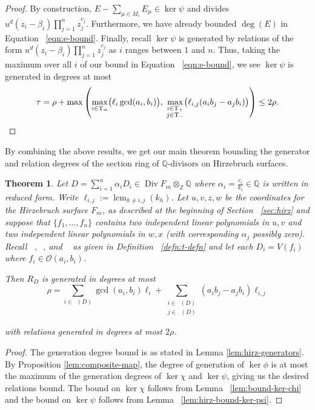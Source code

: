 \documentclass{amsart}
\theoremstyle{plain}
\newtheorem{thm}{Theorem}[subsection]
\theoremstyle{definition}
\theoremstyle{remark}
\newtheorem{rem}[thm]{Remark}
\numberwithin{equation}{section}
\newcommand\bq{{\mathbb Q}}
\newcommand\bz{{\mathbb Z}}
\newcommand\sco{{\mathscr O}}
\DeclareMathOperator\di{Div}
\newcommand\bida{a}
\newcommand\bidb{b}
\newcommand\hirz{F}
\DeclareMathOperator{\Te}{T_=}
\DeclareMathOperator{\Tp}{T_+}
\DeclareMathOperator{\Tm}{T_-}
\DeclareMathOperator{\lcm}{lcm}
\begin{document}
\begin{proof}
By construction, $E - \sum_{\mu \in M_i} E_\mu \in \ker \psi$ and
divides $u^d(z_i - \beta_i) \prod_{j = 1}^n z_j^{c_j}$. 
Furthermore, we have already bounded $\deg(E)$ in Equation ~\eqref{eqn:e-bound}.
Finally, recall $\ker \psi$ is generated by relations of the form $u^d(z_i - \beta_i) \prod_{j = 1}^n z_j^{c_j}$ as
$i$ ranges between $1$ and $n$. Thus, taking the maximum over all $i$ 
of our bound in Equation ~\eqref{eqn:e-bound}, we see $\ker \psi$ is generated in degrees at most
\[
	\tau = \rho
	+ \max \left(\max_{i\in \Te} \bigl(\ell_i \gcd(a_i, b_i) \bigr),
	\; \max_{\substack{i \in \Tp \\ j \in \Tm}} \bigl(\ell_{i, j}
	(\bida_i \bidb_j - \bida_j
	\bidb_i) \bigr) \right)\le 2\rho.
	\qedhere
\]
\end{proof}

By combining the above results, we get our main theorem bounding
the generator and relation degrees of the section ring of
$\bq$-divisors on Hirzebruch surfaces.

\begin{thm}
\label{thm:hirz-generators-relations-full}
Let $D = \sum_{i = 1}^n \alpha_i D_i \in \di \hirz_m \otimes_\bz \bq$
where $\alpha_i = \frac{c_i}{k_i} \in \bq$ is written in reduced form.
Write $\ell_{i,j} := \lcm_{h\ne i,j}(k_h)$.
Let $u, v, z, w$ be the coordinates for the Hirzebruch surface
$\hirz_m$, as described at the beginning of Section
~\ref{sec:hirz} and suppose that $\{f_1, \ldots, f_n\}$
contains two independent 
linear polynomials in $u, v$ and two independent linear polynomials in
$w, x$ {\rm(}with corresponding $\alpha_j$ possibly zero{\rm)}.
Recall $\Te, \Tp$, and $\Tm$ as given in Definition ~\ref{defn:t-defn} and let each $D_i = V(f_i)$ where $f_i \in \sco(a_i, b_i)$.

Then $R_D$ is generated in degrees at most
\[
	\rho = \sum_{i\in \Te(D)} \gcd(\bida_i, \bidb_i)\ell_i +
	\sum_{\substack{i \in \Tp(D) \\	j \in \Tm(D)}} (\bida_i \bidb_j
	- \bida_j \bidb_i) \ell_{i, j}
\]

\noindent
with relations generated in degrees at most $2 \rho$.
\end{thm}
\begin{proof}
The generation degree bound is as stated in Lemma \ref{lem:hirz-generators}.
By Proposition \ref{lem:composite-map}, the degree of generation of
$\ker \phi$ is at most the maximum of the generation degrees of $\ker \chi$
and $\ker \psi$, giving us the desired relations bound. The bound on $\ker \chi$
follows from Lemma ~\ref{lem:bound-ker-chi} and the bound on $\ker \psi$
follows from Lemma ~\ref{lem:hirz-bound-ker-psi}.
\end{proof}
\end{document}

